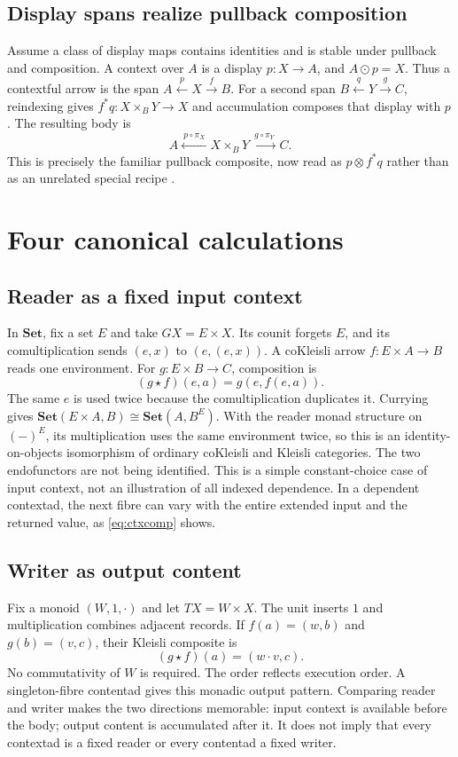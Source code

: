\documentclass[11pt,letterpaper]{article}
\newcommand{\Set}{\mathbf{Set}}
\newcommand{\comp}{\mathbin{\circ}}
\newcommand{\ext}{\mathbin{\odot}}
\begin{document}
\subsection{Display spans realize pullback composition}
Assume a class of display maps contains identities and is stable under pullback and composition. A context over $A$ is a display $p:X\to A$, and $A\ext p=X$. Thus a contextful arrow is the span $A\xleftarrow{p}X\xrightarrow{f}B$. For a second span $B\xleftarrow{q}Y\xrightarrow{g}C$, reindexing gives $f^*q:X\times_B Y\to X$ and accumulation composes that display with $p$. The resulting body is
\[
A\xleftarrow{\ p\comp\pi_X\ }X\times_B Y
 \xrightarrow{\ g\comp\pi_Y\ }C.
\]
This is precisely the familiar pullback composite, now read as $p\otimes f^*q$ rather than as an unrelated special recipe \cite[Example 3.21]{CM}.

\section{Four canonical calculations}
\label{sec:examples}
\subsection{Reader as a fixed input context}
In $\Set$, fix a set $E$ and take $GX=E\times X$. Its counit forgets $E$, and its comultiplication sends $(e,x)$ to $(e,(e,x))$. A coKleisli arrow $f:E\times A\to B$ reads one environment. For $g:E\times B\to C$, composition is
\[
(g\star f)(e,a)=g(e,f(e,a)).
\]
The same $e$ is used twice because the comultiplication duplicates it. Currying gives $\Set(E\times A,B)\cong\Set(A,B^E)$. With the reader monad structure on $(-)^E$, its multiplication uses the same environment twice, so this is an identity-on-objects isomorphism of ordinary coKleisli and Kleisli categories. The two endofunctors are not being identified. This is a simple constant-choice case of input context, not an illustration of all indexed dependence. In a dependent contextad, the next fibre can vary with the entire extended input and the returned value, as \eqref{eq:ctxcomp} shows.

\subsection{Writer as output content}
Fix a monoid $(W,1,\cdot)$ and let $TX=W\times X$. The unit inserts $1$ and multiplication combines adjacent records. If $f(a)=(w,b)$ and $g(b)=(v,c)$, their Kleisli composite is
\[
(g\star f)(a)=(w\cdot v,c).
\]
No commutativity of $W$ is required. The order reflects execution order. A singleton-fibre contentad gives this monadic output pattern. Comparing reader and writer makes the two directions memorable: input context is available before the body; output content is accumulated after it. It does not imply that every contextad is a fixed reader or every contentad a fixed writer.
\end{document}
